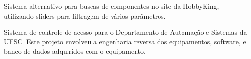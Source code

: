 \documentclass[A4]{deedy-resume} %
\begin{document}
\begin{minipage}[t]{0.66\textwidth}
\begin{tightitemize}
 \item Sistema alternativo para buscas de componentes no site da HobbyKing, utilizando sliders para filtragem de vários parâmetros.
 \end{tightitemize}
 
\sectionspace %

\begin{tightitemize}
 \item Sistema de controle de acesso para o Departamento de Automação e Sistemas da UFSC. Este projeto envolveu a engenharia reversa dos equipamentos, software, e banco de dados adquiridos com o equipamento.
 \end{tightitemize}
 
\sectionspace %







\end{minipage} %

\end{document}
